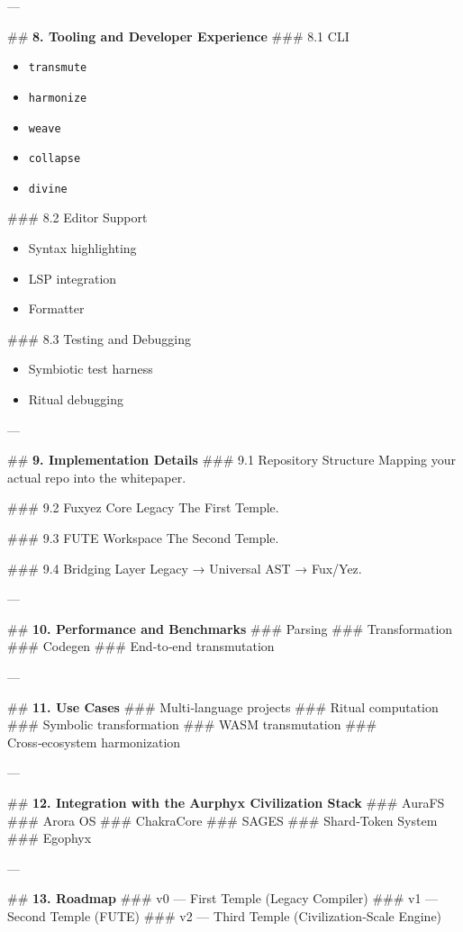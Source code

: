\begin{enumerate}
---

\#\# \textbf{8. Tooling and Developer Experience}
\#\#\# 8.1 CLI  
\begin{itemize}
  \item \texttt{transmute}  
  \item \texttt{harmonize}  
  \item \texttt{weave}  
  \item \texttt{collapse}  
  \item \texttt{divine}  
\end{itemize}

\#\#\# 8.2 Editor Support  
\begin{itemize}
  \item Syntax highlighting  
  \item LSP integration  
  \item Formatter  
\end{itemize}

\#\#\# 8.3 Testing and Debugging  
\begin{itemize}
  \item Symbiotic test harness  
  \item Ritual debugging  
\end{itemize}

---

\#\# \textbf{9. Implementation Details}
\#\#\# 9.1 Repository Structure  
Mapping your actual repo into the whitepaper.

\#\#\# 9.2 Fuxyez Core Legacy  
The First Temple.

\#\#\# 9.3 FUTE Workspace  
The Second Temple.

\#\#\# 9.4 Bridging Layer  
Legacy → Universal AST → Fux/Yez.

---

\#\# \textbf{10. Performance and Benchmarks}
\#\#\# Parsing  
\#\#\# Transformation  
\#\#\# Codegen  
\#\#\# End‑to‑end transmutation  

---

\#\# \textbf{11. Use Cases}
\#\#\# Multi‑language projects  
\#\#\# Ritual computation  
\#\#\# Symbolic transformation  
\#\#\# WASM transmutation  
\#\#\# Cross‑ecosystem harmonization  

---

\#\# \textbf{12. Integration with the Aurphyx Civilization Stack}
\#\#\# AuraFS  
\#\#\# Arora OS  
\#\#\# ChakraCore  
\#\#\# SAGES  
\#\#\# Shard‑Token System  
\#\#\# Egophyx  

---

\#\# \textbf{13. Roadmap}
\#\#\# v0 — First Temple (Legacy Compiler)  
\#\#\# v1 — Second Temple (FUTE)  
\#\#\# v2 — Third Temple (Civilization‑Scale Engine)  


\end{enumerate}
